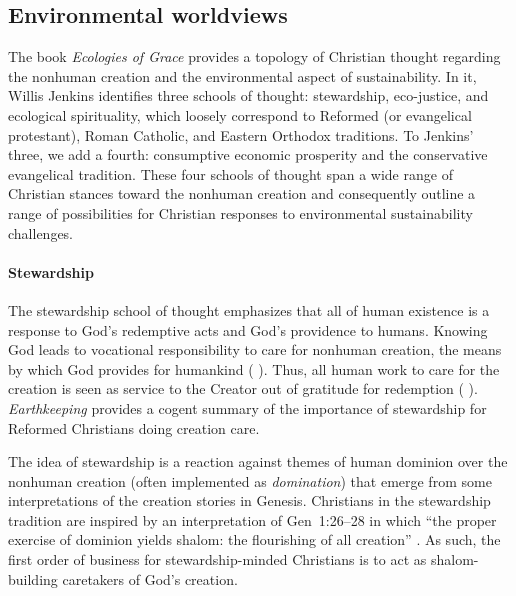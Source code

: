 \documentclass[12pt]{article}
\begin{document}
\subsection{Environmental worldviews}
\label{sec:environmental}

The book \emph{Ecologies of Grace} \autocite{Jenkins:2008}
provides a topology of Christian thought regarding the 
nonhuman creation and the
environmental aspect of sustainability.
In it, Willis Jenkins identifies three schools of thought:
stewardship, 
eco-justice, and 
ecological spirituality,
which loosely correspond to 
Reformed (or evangelical protestant), 
Roman Catholic, and 
Eastern Orthodox 
traditions.
To Jenkins' three, we add a fourth:
consumptive economic prosperity and
the conservative evangelical tradition. 
These four schools of thought 
span a wide range of Christian stances toward the nonhuman creation
and 
consequently outline a range of possibilities 
for Christian responses to environmental sustainability challenges.

\paragraph{Stewardship} 
\label{sec:stewardship}

The stewardship school of thought 
emphasizes that all of human existence
is a response to God's redemptive acts
and God's providence to humans.
Knowing God leads to vocational responsibility 
to care for nonhuman creation,
the means by which God provides for humankind 
(\textcite{Jenkins:2008} \textcite[19]{Jenkins:2008}). 
Thus, all human work to care for the creation 
is seen as service to the Creator
out of gratitude for redemption (\textcite{Jenkins:2008} \textcite[77]{Jenkins:2008}).
\emph{Earthkeeping} \autocite{Wilkenson:1980aa} provides a cogent summary
of the importance of stewardship for Reformed Christians doing creation care.

The idea of stewardship is a reaction 
against themes of human dominion over the nonhuman creation
(often implemented as \emph{domination})
that emerge from some interpretations of the creation stories in Genesis.
Christians in the stewardship tradition are inspired by an interpretation of Gen~1:26–28 in which 
``the proper exercise of dominion yields shalom: the flourishing of all creation'' \autocite{BoumaPrediger:2019}.
As such, the first order of business for stewardship-minded Christians
is to act as shalom-building caretakers of God's creation.
\end{document}
